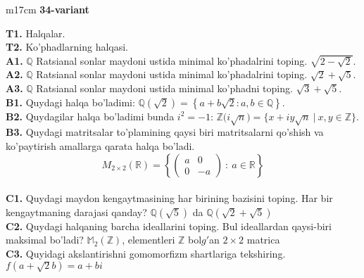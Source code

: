 \documentclass{article}
\begin{document}
\begin{tabular}{m{17cm}}
\textbf{34-variant}
\newline

\textbf{T1.} Halqalar. \\
\textbf{T2.} Ko'phadlarning halqasi. \\
\textbf{A1.} \(\mathbb{Q}\) Ratsianal sonlar maydoni ustida minimal ko'phadalrini toping.
\(\sqrt{2 - \sqrt{2}}\). \\
\textbf{A2.} \(\mathbb{Q}\) Ratsianal sonlar maydoni ustida minimal ko'phadalrini toping.
\(\sqrt{2} + \sqrt{5}\). \\
\textbf{A3.} \(\mathbb{Q}\) Ratsianal sonlar maydoni ustida minimal ko'phadni toping.
\(\sqrt{3} + \sqrt{5}\). \\
\textbf{B1.} Quydagi halqa bo'ladimi:
\(\mathbb{Q}\left( \sqrt{2} \right) = \left\{ a + b\sqrt{2}:a,b \in \mathbb{Q} \right\}\). \\
\textbf{B2.} Quydagilar halqa bo'ladimi bunda \(i^{2} = - 1\):
\(\mathbb{Z(}i\sqrt{n}) = \{ x + iy\sqrt{n}\ |\ x,y \in \mathbb{Z\}}\). \\
\textbf{B3.} Quydagi matritsalar to'plamining qaysi biri matritsalarni qo'shish va ko'paytirish amallarga qarata halqa bo'ladi.
\[M_{2 \times 2}\mathbb{(R) =}\left\{ \begin{pmatrix}
a & 0 \\
0 & - a
\end{pmatrix}\ :\ a \in \mathbb{R} \right\}\] \\
\textbf{C1.} Quydagi maydon kengaytmasining har birining bazisini toping. Har bir kengaytmaning darajasi qanday?
\(\mathbb{Q}\left( \sqrt{5} \right)\) da \(\mathbb{Q}\left( \sqrt{2} + \sqrt{5} \right)\) \\
\textbf{C2.} Quydagi halqaning barcha ideallarini toping. Bul ideallardan qaysi-biri maksimal bo'ladi?
\(\mathbb{M}_{2}\left( \mathbb{Z} \right)\), elementleri \(\mathbb{Z}\) bol\(g'\)an \(2 \times 2\) matrica \\
\textbf{C3.} Quyidagi akslantirishni gomomorfizm shartlariga tekshiring. \(f\left( a + \sqrt{2}b \right) = a + bi\) \\

\end{tabular}
\vspace{1cm}
\end{document}
